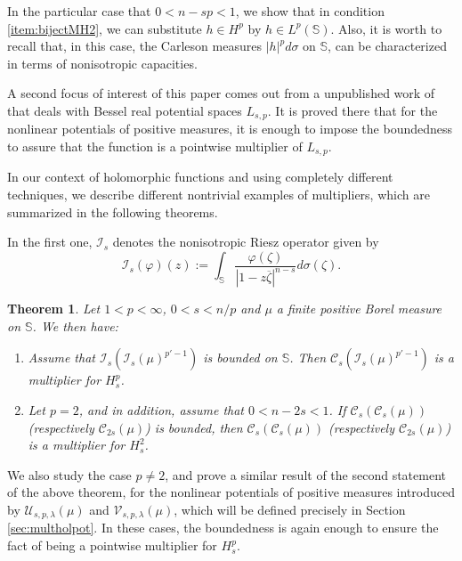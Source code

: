 \documentclass[12pt,twoside,leqno,final]{amsart}
\theoremstyle{plain}
\newtheorem{thm}{Theorem}[section]
\begin{document}
In the particular case that $0<n-sp<1$, we  show that in condition \eqref{item:bijectMH2}, we can substitute $h\in H^p$ by $h \in L^p({{\mathbb S}})$. Also, it is worth to recall that, in this case, the Carleson measures $|h|^pd\sigma$ on ${{\mathbb S}}$, can be characterized in terms of nonisotropic capacities.

A second focus of interest of this paper comes out from a unpublished work of \cite{boe} that deals with Bessel real potential spaces $L_{s,p}$. It is proved there that for the nonlinear potentials of positive measures, it is enough to impose the boundedness to assure that the function is a pointwise multiplier of $L_{s,p}$. 

In our context of holomorphic functions and using completely different techniques, we describe different nontrivial examples of multipliers, which are summarized in the following theorems. 

In the first one,    $\mathcal{I}_s$ denotes the nonisotropic Riesz operator given by
$$\mathcal{I}_s(\varphi)(z):=\int_{{\mathbb S}} \frac{\varphi({\zeta})}{|1-z\overline {\zeta}|^{n-s}}d\sigma({\zeta}).$$ 

 
\begin{thm}\label{prop:multiplierscasp=2}
Let $1<p<\infty$, $0<s<n/p$ and $\mu$ a finite positive Borel measure on ${{\mathbb S}}$. We then have:
\begin{enumerate}
\item \label{item:multiplierscasp=21} 
 Assume that $\mathcal{I}_s(\mathcal{I}_s(\mu)^{p'-1})$ is bounded on ${{\mathbb S}}$. Then ${\mathcal C}_s(\mathcal{I}_s(\mu)^{p'-1})$ is a multiplier for $H_s^p$.
\item \label{item:multiplierscasp=22}
Let $p=2$, and in addition, assume that $0<n-2s<1$. If  ${\mathcal C}_s({\mathcal C}_s(\mu))$ (respectively ${\mathcal C}_{2s}(\mu)$) is bounded, then ${\mathcal C}_s({\mathcal C}_s(\mu))$ (respectively  ${\mathcal C}_{2s}(\mu)$) is a multiplier for $H_s^2$.
\end{enumerate}
\end{thm}

 We also study the case  $p\neq 2$, and prove a similar result of the second statement of the above theorem, for the nonlinear potentials of positive measures introduced by \cite{cohnverbitsky} ${\mathcal U}_{s,p,\lambda}(\mu)$ and ${\mathcal V}_{s,p,\lambda}(\mu)$, which will be defined precisely in Section \ref{sec:multholpot}. In these cases, the boundedness is again enough to ensure the fact of being a pointwise multiplier for $H_s^p$. 
 
\end{document}
